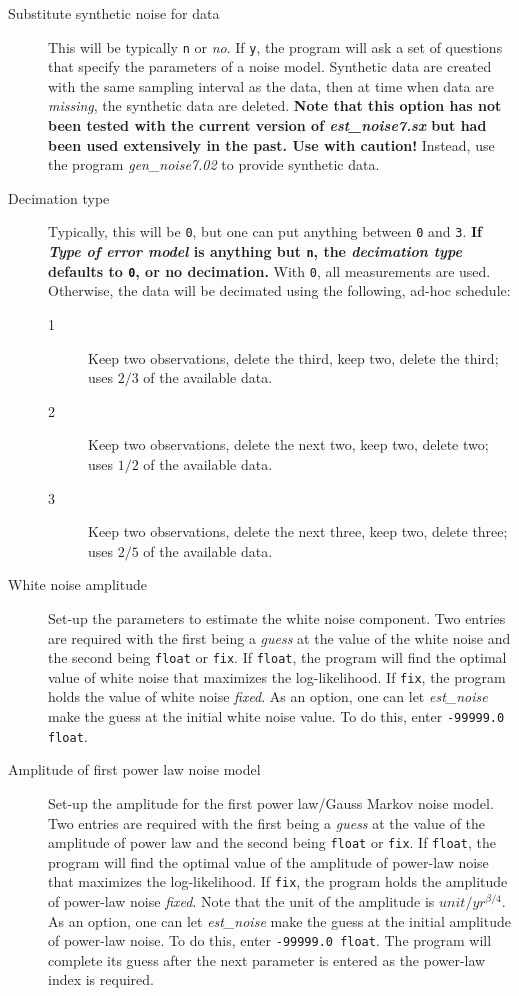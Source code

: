 \documentclass[12pt]{amsart}
\begin{document}
\begin{description}
\item[Substitute synthetic noise for data]  This will be typically \texttt{n} or \textit{no}.  If \texttt{y}, the program will
ask a set of questions that specify the parameters of a noise model. Synthetic data are created with the same
sampling interval as the data, then at time when data are \textit{missing}, the synthetic data are deleted. \textbf{Note that
this option has not been tested with the current version of \textit{est\_noise7.sx} but had been used extensively in
the past. Use with caution!}  Instead, use the program \textit{gen\_noise7.02} to provide synthetic data.

\item[Decimation type]  Typically, this will be \texttt{0}, but one can put anything between \texttt{0} and \texttt{3}.
\textbf{If \textit{Type of error model} is anything but \texttt{n}, the \textit{decimation type} defaults to \texttt{0}, or no decimation.}
With \texttt{0}, all measurements are used.  Otherwise, the data will be decimated using the following, ad-hoc schedule:
\begin{description}
\item[1]  Keep two observations, delete the third, keep two, delete the third; uses $2/3$ of the available data.
\item[2] Keep two observations, delete the next two, keep two, delete two; uses $1/2$ of the available data.
\item[3] Keep two observations, delete the next three, keep two, delete three; uses $2/5$ of the available data.
\end{description}

\item[White noise amplitude] Set-up the parameters to estimate the white noise component. Two entries are required
with the first being a \textit{guess} at the value of the white noise and the second being \texttt{float} or \texttt{fix}.
If \texttt{float}, the program will find the optimal value of white noise that maximizes the log-likelihood. If \texttt{fix},
the program holds the value of white noise \textit{fixed}.  As an option, one can let \textit{est\_noise} make the guess
at the initial white noise value.  To do this, enter \texttt{-99999.0 float}.

\item[Amplitude of first power law noise model] Set-up the amplitude for the first power law/Gauss Markov noise model. Two entries are required
with the first being a \textit{guess} at the value of the amplitude of power law and the second being \texttt{float} or \texttt{fix}.
If \texttt{float}, the program will find the optimal value of the amplitude of power-law noise that maximizes the log-likelihood. If \texttt{fix},
the program holds the amplitude of power-law noise \textit{fixed}.  Note that the unit of the amplitude is $unit/{yr^{{\beta}/4}}$.
As an option, one can let \textit{est\_noise} make the guess
at the initial amplitude of power-law noise.  To do this, enter \texttt{-99999.0 float}.  The program will complete its guess
after the next parameter is entered as the power-law index is required.


\end{description}
\end{document}
